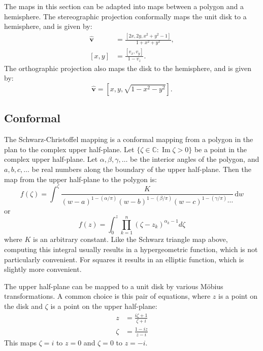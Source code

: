 \documentclass{amsart}[12pt]
\begin{document}
The maps in this section can be adapted into maps between a polygon and a hemisphere.
The stereographic projection conformally maps the unit disk to a hemisphere,
and is given by:
\begin{equation}\begin{split}
  \hat{\mathbf v} &= \frac{[2x, 2y, x^2+y^2-1]}{1+x^2+y^2}, \\
  [x, y] & = \frac{[v_x, v_y]}{1-v_z}.
\end{split}\end{equation}
The orthographic projection also maps the disk to the hemisphere,
and is given by:
\begin{equation}
  \hat{\mathbf v} = [x, y, \sqrt{1-x^2-y^2}].
\end{equation}
\subsection{Conformal}
The Schwarz-Christoffel mapping is a conformal mapping from a polygon in the
plan to the complex upper half-plane. Let $\{ \zeta \in \mathbb{C}:
\operatorname{Im} \zeta > 0 \}$ be a point in the complex upper half-plane. Let
$\alpha,\beta,\gamma, \ldots$ be the interior angles of the polygon, and $a, b,
c, \ldots$ be real numbers along the boundary of the upper half-plane. Then the
map from the upper half-plane to the polygon is:
\begin{equation}
f(\zeta) = \int^\zeta \frac{K}{(w-a)^{1-(\alpha/\pi)} (w-b)^{1-(\beta/\pi)}
(w-c)^{1-(\gamma/\pi)} \cdots} \,\mathrm{d}w
\end{equation}
or
\begin{equation}
f(z) = \int_0^z \prod_{k=1}^n (\zeta - z_k)^{\alpha_k-1} d\zeta
\end{equation}
where $K$ is an arbitrary constant. Like the Schwarz triangle map above,
computing this integral usually results in a hypergeometric function,
which is not particularly convenient. For squares it results in an elliptic function, which is slightly more convenient.\cite{fong16}

The upper half-plane can be mapped to a unit disk by various Möbius
transformations. A common choice is this pair of equations,
where $z$ is a point on the disk and $\zeta$ is a point on the upper half-plane:
\begin{equation}\begin{split}
  z &=\frac{i\zeta+1}{\zeta+i} \\
  \zeta &= \frac{1 - i z}{z - i}
\end{split}\end{equation}
This maps $\zeta = i$ to $z = 0$ and $\zeta = 0$ to $z = -i$.
\end{document}
